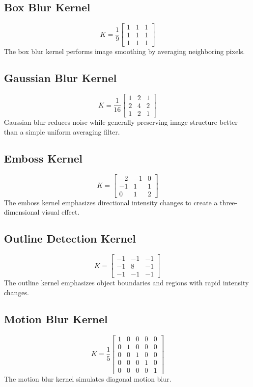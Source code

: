 \documentclass[11pt]{article}
\begin{document}
\subsection{Box Blur Kernel}
\[
K = \frac{1}{9}\begin{bmatrix} 1 & 1 & 1 \\ 1 & 1 & 1 \\ 1 & 1 & 1 \end{bmatrix}
\]
The box blur kernel performs image smoothing by averaging neighboring pixels.

\subsection{Gaussian Blur Kernel}
\[
K = \frac{1}{16}\begin{bmatrix} 1 & 2 & 1 \\ 2 & 4 & 2 \\ 1 & 2 & 1 \end{bmatrix}
\]
Gaussian blur reduces noise while generally preserving image structure better than a simple uniform averaging filter.

\subsection{Emboss Kernel}
\[
K = \begin{bmatrix} -2 & -1 & 0 \\ -1 & 1 & 1 \\ 0 & 1 & 2 \end{bmatrix}
\]
The emboss kernel emphasizes directional intensity changes to create a three-dimensional visual effect.

\subsection{Outline Detection Kernel}
\[
K = \begin{bmatrix} -1 & -1 & -1 \\ -1 & 8 & -1 \\ -1 & -1 & -1 \end{bmatrix}
\]
The outline kernel emphasizes object boundaries and regions with rapid intensity changes.

\subsection{Motion Blur Kernel}
\[
K = \frac{1}{5}\begin{bmatrix}
1 & 0 & 0 & 0 & 0 \\
0 & 1 & 0 & 0 & 0 \\
0 & 0 & 1 & 0 & 0 \\
0 & 0 & 0 & 1 & 0 \\
0 & 0 & 0 & 0 & 1
\end{bmatrix}
\]
The motion blur kernel simulates diagonal motion blur.
\end{document}
